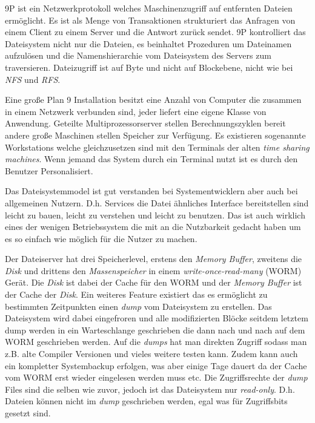 \documentclass[11pt,technote]{IEEEtran}
\begin{document}
        9P ist ein Netzwerkprotokoll welches Maschinenzugriff auf entfernten Dateien erm\"oglicht.
        Es ist als Menge von Transaktionen strukturiert das Anfragen von einem Client zu einem Server und die Antwort zur\"uck sendet.
        9P kontrolliert das Dateisystem nicht nur die Dateien, es beinhaltet Prozeduren um Dateinamen aufzul\"osen und die Namenshierarchie
        vom Dateisystem des Servers zum traversieren.
        Dateizugriff ist auf Byte und nicht auf Blockebene, nicht wie bei \textit{NFS} und \textit{RFS}.
        
        Eine gro\ss e Plan 9 Installation besitzt eine Anzahl von Computer die zusammen in einem Netzwerk verbunden sind,
        jeder liefert eine eigene Klasse von Anwendung. Geteilte Multiprozessorserver stellen
        Berechnungszyklen bereit andere gro\ss e Maschinen stellen Speicher zur Verf\"ugung. Es existieren sogenannte Workstations welche gleichzusetzen sind mit den 
        Terminals der alten \textit{time sharing machines}. Wenn jemand das System durch ein Terminal nutzt ist es durch den Benutzer Personalisiert.
    
        Das Dateisystemmodel ist gut verstanden bei Systementwicklern aber auch bei allgemeinen Nutzern. 
        D.h. Services die Datei \"ahnliches Interface bereitstellen sind leicht zu bauen, leicht zu verstehen
        und leicht zu benutzen. Das ist auch wirklich eines der wenigen Betriebssystem die mit an die Nutzbarkeit
        gedacht haben um es so einfach wie m\"oglich f\"ur die Nutzer zu machen.
        
        Der Dateiserver hat drei Speicherlevel, erstens den \textit{Memory Buffer}, zweitens die \textit{Disk} und drittens den \textit{Massenspeicher}
        in einem \textit{write-once-read-many} (WORM) Ger\"at. 
        Die \textit{Disk} ist dabei der Cache f\"ur den WORM und der \textit{Memory Buffer} ist der Cache der \textit{Disk}.
        Ein weiteres Feature existiert das es erm\"oglicht zu bestimmten Zeitpunkten einen \textit{dump} vom
        Dateisystem zu erstellen. Das Dateisystem wird dabei eingefroren und alle modifizierten Bl\"ocke seitdem letztem dump werden in ein Warteschlange geschrieben
        die dann nach und nach auf dem WORM geschrieben werden. Auf die \textit{dumps} hat man direkten Zugriff sodass man z.B. alte Compiler Versionen
        und vieles weitere testen kann.
        Zudem kann auch ein kompletter Systembackup erfolgen, was aber einige Tage dauert da der Cache vom WORM erst wieder eingelesen werden muss etc.
        Die Zugriffsrechte der \textit{dump} Files sind die selben wie zuvor, jedoch ist das Dateisystem nur \textit{read-only}.
        D.h. Dateien k\"onnen nicht im \textit{dump} geschrieben werden, egal was f\"ur Zugriffsbits gesetzt sind.
        
\end{document}
